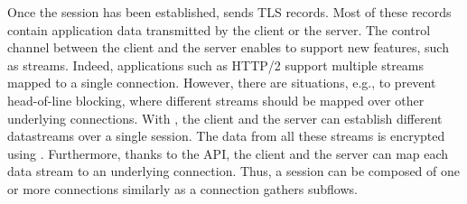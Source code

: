 

Once the \tcpls session has been established, \tcpls sends TLS records. Most of
these records contain application data transmitted by the client or
the server. The control channel between the client and the
server enables \tcpls to support new features, such as streams. Indeed, applications such as HTTP/2 support multiple streams mapped to a single
\tcp connection. However, there are situations, e.g., to prevent head-of-line
blocking, where different streams should be mapped over other underlying \tcp
connections. With \tcpls, the client and the server can establish different
datastreams over a single \tcpls session. The data from all these streams is
encrypted using \tls. Furthermore, thanks to the \tcpls API, the client and the
server can map each data stream to an underlying \tcp connection.
Thus, a \tcpls session can be composed of one or more \tcp connections
similarly as a \mptcp connection gathers subflows.

